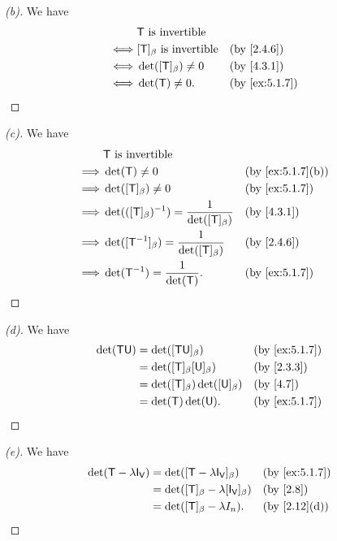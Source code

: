 \begin{proof}[(b)]
	We have
	\begin{align*}
		     & \T \text{ is invertible}                              \\
		\iff & [\T]_{\beta} \text{ is invertible} &  & \by{2.4.6}    \\
		\iff & \det([\T]_{\beta}) \neq 0          &  & \by{4.3.1}    \\
		\iff & \det(\T) \neq 0.                   &  & \by{ex:5.1.7}
	\end{align*}
\end{proof}

\begin{proof}[(c)]
	We have
	\begin{align*}
		         & \T \text{ is invertible}                                                       \\
		\implies & \det(\T) \neq 0                                          &  & \by{ex:5.1.7}[b] \\
		\implies & \det([\T]_{\beta}) \neq 0                                &  & \by{ex:5.1.7}    \\
		\implies & \det(([\T]_{\beta})^{-1}) = \frac{1}{\det([\T]_{\beta})} &  & \by{4.3.1}       \\
		\implies & \det([\T^{-1}]_{\beta}) = \frac{1}{\det([\T]_{\beta})}   &  & \by{2.4.6}       \\
		\implies & \det(\T^{-1}) = \frac{1}{\det(\T)}.                      &  & \by{ex:5.1.7}
	\end{align*}
\end{proof}

\begin{proof}[(d)]
	We have
	\begin{align*}
		\det(\T \U) & = \det([\T \U]_{\beta})                 &  & \by{ex:5.1.7} \\
		            & = \det([\T]_{\beta} [\U]_{\beta})       &  & \by{2.3.3}    \\
		            & = \det([\T]_{\beta}) \det([\U]_{\beta}) &  & \by{4.7}      \\
		            & = \det(\T) \det(\U).                    &  & \by{ex:5.1.7}
	\end{align*}
\end{proof}

\begin{proof}[(e)]
	We have
	\begin{align*}
		\det(\T - \lambda \IT[\V]) & = \det([\T - \lambda \IT[\V]]_{\beta})           &  & \by{ex:5.1.7} \\
		                           & = \det([\T]_{\beta} - \lambda [\IT[\V]]_{\beta}) &  & \by{2.8}      \\
		                           & = \det([\T]_{\beta} - \lambda I_n).              &  & \by{2.12}[d]
	\end{align*}
\end{proof}

